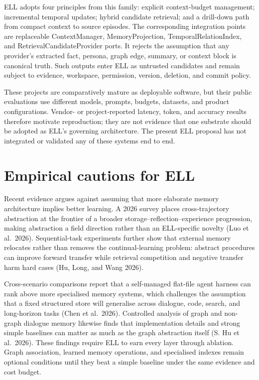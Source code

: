\documentclass[
  english,
  a4paper,
  DIV=11,
  numbers=noendperiod]{scrreprt}
\begin{document}
ELL adopts four principles from this family: explicit context-budget
management; incremental temporal updates; hybrid candidate retrieval;
and a drill-down path from compact context to source episodes. The
corresponding integration points are replaceable ContextManager,
MemoryProjection, TemporalRelationIndex, and RetrievalCandidateProvider
ports. It rejects the assumption that any provider's extracted fact,
persona, graph edge, summary, or context block is canonical truth. Such
outputs enter ELL as untrusted candidates and remain subject to
evidence, workspace, permission, version, deletion, and commit policy.

These projects are comparatively mature as deployable software, but
their public evaluations use different models, prompts, budgets,
datasets, and product configurations. Vendor- or project-reported
latency, token, and accuracy results therefore motivate reproduction;
they are not evidence that one substrate should be adopted as ELL's
governing architecture. The present ELL proposal has not integrated or
validated any of these systems end to end.

\section{Empirical cautions for ELL}\label{empirical-cautions-for-ell}

Recent evidence argues against assuming that more elaborate memory
architecture implies better learning. A 2026 survey places
cross-trajectory abstraction at the frontier of a broader
storage--reflection--experience progression, making abstraction a field
direction rather than an ELL-specific novelty (Luo et al.~2026).
Sequential-task experiments further show that external memory relocates
rather than removes the continual-learning problem: abstract procedures
can improve forward transfer while retrieval competition and negative
transfer harm hard cases (Hu, Long, and Wang 2026).

Cross-scenario comparisons report that a self-managed flat-file agent
harness can rank above more specialised memory systems, which challenges
the assumption that a fixed structured store will generalise across
dialogue, code, search, and long-horizon tasks (Chen et al.~2026).
Controlled analysis of graph and non-graph dialogue memory likewise
finds that implementation details and strong simple baselines can matter
as much as the graph abstraction itself (S. Hu et al.~2026). These
findings require ELL to earn every layer through ablation. Graph
association, learned memory operations, and specialised indexes remain
optional conditions until they beat a simple baseline under the same
evidence and cost budget.
\end{document}
